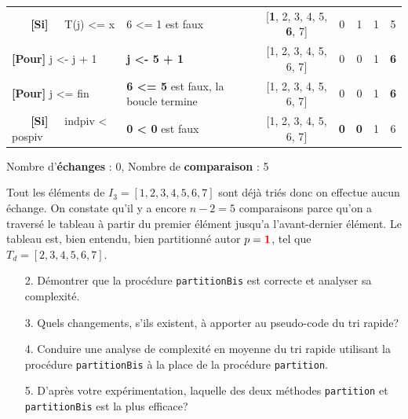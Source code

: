 \documentclass[10pt]{article} %
\newcommand{\asgold}[1]{\textcolor{mygold}{{\bf#1}}}
\newcommand{\asred}[1]{\textcolor{red}{{\bf#1}}}
\newcommand{\asgr}[1]{\textcolor{mygreen}{{\bf#1}}}
\newcommand{\aspurp}[1]{\textcolor{mypurp}{{\bf#1}}}
\begin{document}
\begin{table}[h!]
\begin{tabular}{ll|ccccc}
    \asgr{\ \ \ [Si]\ \ } T(j) \textless{}= x       & \cellcolor{mypurp} 6 \textless{}= 1 est faux                                     & {[}\aspurp{1}, 2, 3, 4, 5, \aspurp{6}, 7{]} & 0      & 1      & 1& 5 \\
    \asgr{[Pour]} j \textless{}- j + 1  &  \asgold{j \textless{}- 5 + 1}                                                              & {[}1, 2, 3, 4, 5, 6, 7{]} & 0      & 0      & 1& \asgold{6} \\
    \asgr{[Pour]} j \textless{}= fin      & \aspurp{6 \textless{}= 5} est faux, la boucle termine                   & {[}1, 2, 3, 4, 5, 6, 7{]} & 0      & 0      & 1 & \aspurp{6} \\
    \asgr{\ \ \ [Si]\ \ } indpiv \textless{} pospiv   & \aspurp{0 \textless{} 0} est faux &  {[}1, 2, 3, 4, 5, 6, 7{]} & \aspurp{0}      & \aspurp{0}      & 1 & 6 \\
    \hline
    \end{tabular}
    \end{table}

\vspace{-.4cm}
\noindent Nombre d'\asgold{échanges} : 0, Nombre de \aspurp{comparaison} : 5
\newpage

Tout les éléments de $I_3 = [1, 2, 3, 4, 5, 6, 7]$ sont déjà triés donc on effectue aucun échange. On constate qu'il y a encore $n - 2 = 5$ comparaisons parce qu'on a
traversé le tableau à partir du premier élément jusqu'a l'avant-dernier élément. Le tableau est, bien entendu, bien partitionné autor $p = \asred{1}$, tel que $T_d = [2, 3, 4, 5, 6, 7]$.


\begin{itemize}
    \item[2.] Démontrer que la procédure \texttt{partitionBis} est correcte et analyser sa complexité.
\end{itemize}

\begin{itemize}
    \item[3.] Quels changements, s'ils existent, à apporter au pseudo-code du tri rapide?
\end{itemize}

\begin{itemize}
    \item[4.] Conduire une analyse de complexité en moyenne du tri rapide utilisant la procédure \texttt{partitionBis} à la
    place de la procédure \texttt{partition}.
\end{itemize}

\begin{itemize}
    \item[5.] D'après votre expérimentation, laquelle des deux méthodes \texttt{partition} et \texttt{partitionBis} est la
    plus efficace?
\end{itemize}
\end{document}
